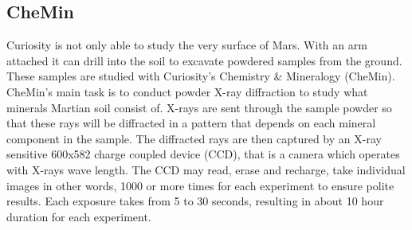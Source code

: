 \subsection{CheMin}
Curiosity is not only able to study the very surface of Mars.
With an arm attached it can drill into the soil to excavate powdered samples from the ground.
These samples are studied with Curiosity's Chemistry \& Mineralogy (CheMin).
CheMin's main task is to conduct powder X-ray diffraction to study what minerals Martian soil consist of.
X-rays are sent through the sample powder so that these rays will be diffracted in a pattern that depends on each mineral component in the sample.
The diffracted rays are then captured by an X-ray sensitive 600x582 charge coupled device (CCD), that is a camera which operates with X-rays wave length.
The CCD may read, erase and recharge, take individual images in other words, 1000 or more times for each experiment to ensure polite results.
Each exposure takes from 5 to 30 seconds, resulting in about 10 hour duration for each experiment. \cite{CheMin}